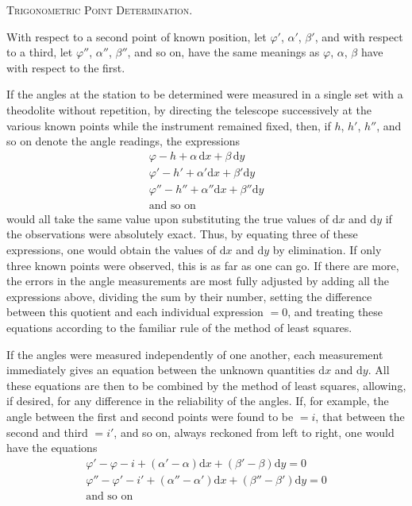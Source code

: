 \begingroup
\clearpage
{}\hfill\textsc{Trigonometric Point Determination.}\hfill\mbox{}\par\medskip
With respect to a second point of known position, let $\varphi'$, $\alpha'$, $\beta'$, and with respect to a third, let $\varphi''$, $\alpha''$, $\beta''$, and so on, have the same meanings as $\varphi$, $\alpha$, $\beta$ have with respect to the first.

If the angles at the station to be determined were measured in a single set with a theodolite without repetition, by directing the telescope successively at the various known points while the instrument remained fixed, then, if $h$, $h'$, $h''$, and so on denote the angle readings, the expressions
\[
\begin{gathered}
\varphi-h+\alpha\,\mathrm dx+\beta\,\mathrm dy\\
\varphi'-h'+\alpha'\mathrm dx+\beta'\mathrm dy\\
\varphi''-h''+\alpha''\mathrm dx+\beta''\mathrm dy\\
\text{and so on}
\end{gathered}
\]
would all take the same value upon substituting the true values of $\mathrm dx$ and $\mathrm dy$ if the observations were absolutely exact. Thus, by equating three of these expressions, one would obtain the values of $\mathrm dx$ and $\mathrm dy$ by elimination. If only three known points were observed, this is as far as one can go. If there are more, the errors in the angle measurements are most fully adjusted by adding all the expressions above, dividing the sum by their number, setting the difference between this quotient and each individual expression $=0$, and treating these equations according to the familiar rule of the method of least squares.

If the angles were measured independently of one another, each measurement immediately gives an equation between the unknown quantities $\mathrm dx$ and $\mathrm dy$. All these equations are then to be combined by the method of least squares, allowing, if desired, for any difference in the reliability of the angles. If, for example, the angle between the first and second points were found to be $=i$, that between the second and third $=i'$, and so on, always reckoned from left to right, one would have the equations
\[
\begin{gathered}
\varphi'-\varphi-i+(\alpha'-\alpha)\mathrm dx+(\beta'-\beta)\mathrm dy=0\\
\varphi''-\varphi'-i'+(\alpha''-\alpha')\mathrm dx+(\beta''-\beta')\mathrm dy=0\\
\text{and so on}
\end{gathered}
\]


